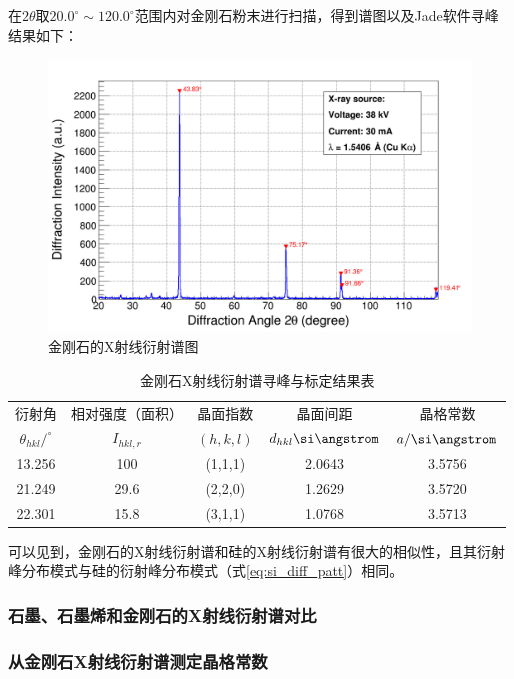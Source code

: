 \documentclass{thuemp}
\begin{document}
在$2\theta$取$20.0^\circ \sim 120.0^\circ$范围内对金刚石粉末进行扫描，得到谱图以及Jade软件寻峰结果如下：

\begin{figure}[H]
    \centering
    \includegraphics[width=0.8\linewidth]{../Data/C-Diamond-multi.png}
    \caption{金刚石的X射线衍射谱图}
    \label{fig:diamond_xrd}
\end{figure}

\begin{table}
    \centering
    \captionnamefont{\wuhao\bf\heiti}
    \captiontitlefont{\wuhao\bf\heiti}
    \caption{金刚石X射线衍射谱寻峰与标定结果表}
    \label{tab:diamond_xrd}
    \liuhao
    \begin{tabular}{ccccc}
        \toprule
        衍射角 & 相对强度（面积）& 晶面指数 & 晶面间距 & 晶格常数 \\
        $\theta_{hkl}/^\circ$ & $I_{hkl,r}$ & $(h,k,l)$ & $d_{hkl}\text{\si\angstrom}$ & $a/\text{\si\angstrom}$\\
        \midrule
        13.256 &  100 & (1,1,1) &  2.0643 & 3.5756 \\
        21.249 & 29.6 & (2,2,0) &  1.2629 & 3.5720 \\
        22.301 & 15.8 & (3,1,1) &  1.0768 & 3.5713 \\
        \bottomrule
    \end{tabular}
\end{table}

可以见到，金刚石的X射线衍射谱和硅的X射线衍射谱有很大的相似性，且其衍射峰分布模式与硅的衍射峰分布模式（式\ref{eq:si_diff_patt}）相同。

\subsubsection{石墨、石墨烯和金刚石的X射线衍射谱对比}

\subsubsection{从金刚石X射线衍射谱测定晶格常数}
\end{document}
